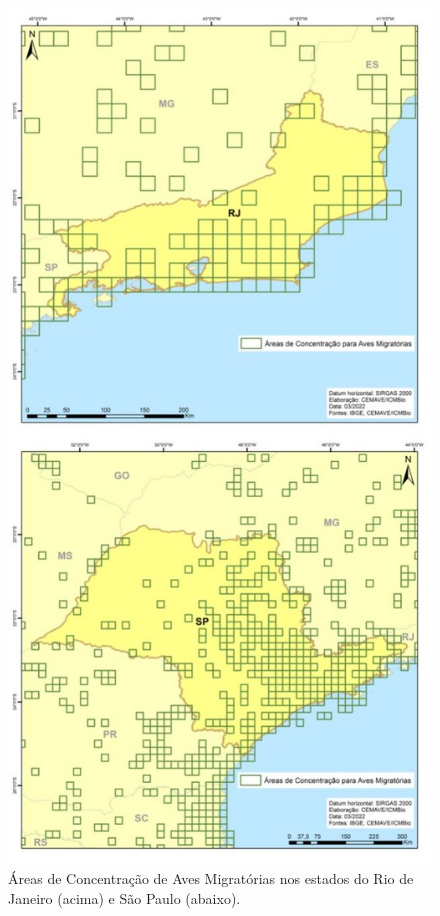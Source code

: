 \documentclass[
  oneside]{scrbook}
\begin{document}
\begin{figure}[H]

{\centering \includegraphics[width=0.7\linewidth]{imagens/cap07/Fig_20_RJ_SP} 

}

\caption{Áreas de Concentração de Aves Migratórias nos estados do Rio de Janeiro (acima) e São Paulo (abaixo).}\label{fig:40}
\end{figure}
\end{document}
